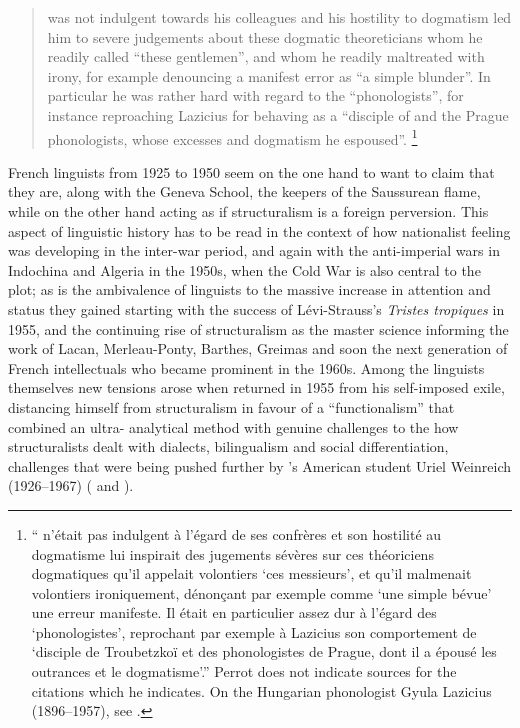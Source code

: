 \documentclass[output=paper]{langscibook}
\begin{document}
\begin{quotation}
{\Sauvageot} was not indulgent towards his colleagues and his hostility to dogmatism led him to severe judgements about these dogmatic theoreticians whom he readily called ``these gentlemen'', and whom he readily maltreated with irony, for example denouncing a manifest error as ``a simple blunder''. In particular he was rather hard with regard to the ``phonologists'', for instance reproaching Lazicius for behaving as a ``disciple of {\Trubetzkoy} and the Prague phonologists, whose excesses and dogmatism he espoused''. \citep[16]{Perrot2009}\footnote{``{\Sauvageot} n'était pas indulgent à l'égard de ses confrères et son hostilité au dogmatisme lui inspirait des jugements sévères sur ces théoriciens dogmatiques qu'il appelait volontiers `ces messieurs', et qu'il malmenait volontiers ironiquement, dénonçant par exemple comme `une simple bévue' une erreur manifeste. Il était en particulier assez dur à l'égard des `phonologistes', reprochant par exemple à Lazicius son comportement de `disciple de Troubetzkoï et des phonologistes de Prague, dont il a épousé les outrances et le dogmatisme'.'' Perrot does not indicate sources for the citations which he indicates. On the Hungarian phonologist Gyula Lazicius (1896--1957), see \citet[288]{Voigt1986}.}
\end{quotation}

French linguists from 1925 to 1950 seem on the one hand to want to claim that they are, along with the Geneva School, the keepers of the Saussurean  flame, while on the other hand acting as if structuralism is a foreign perversion. This aspect of linguistic history has to be read in the context of how nationalist feeling was developing in the inter-war period, and again with the anti-imperial wars in Indochina and Algeria in the 1950s, when the Cold War is also central to the plot; as is the ambivalence of linguists to the massive increase in attention and status they gained starting with the success of Lévi-Strauss's \emph{Tristes tropiques} in 1955, and the continuing rise of structuralism as the master science informing the work of Lacan, Merleau-Ponty, Barthes, Greimas and soon the next generation of French intellectuals who became prominent in the 1960s. Among the linguists themselves new tensions arose when {\Martinet} returned in 1955 from his self-imposed exile, distancing himself from structuralism in favour of a ``functionalism'' that combined an ultra- analytical method with genuine challenges to the how structuralists dealt with dialects, bilingualism and social differentiation, challenges that were being pushed further by {\Martinet}'s American student Uriel Weinreich (1926--1967) (\citealt[see, e.g.,][]{Weinreich1954} and \citealt{Joseph2016}).
\end{document}

